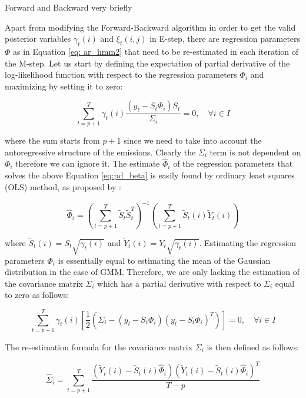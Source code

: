 Forward and Backward very briefly

Apart from modifying the Forward-Backward algorithm in order to get the valid posterior variables $\gamma_t(i)$ and $\xi_t(i,j)$ in E-step, there are 
regression parameters $\Phi$ as in Equation \ref{eq: ar_hmm2} that need to be re-estimated in each iteration of the M-step. Let us start by defining the 
expectation of partial derivative of the log-likelihood function with respect to the regression parameters $\Phi_{i}$ and maximizing by setting it to zero:

\begin{equation} \label{eq:pd_beta}
    \sum_{t=p+1}^{T} \gamma_t(i) \frac{(y_t - S_t \Phi_{i})S_t}{\Sigma_i} = 0, \quad \forall i \in I
\end{equation}

where the sum starts from $p+1$ since we need to take into account the autoregressive structure of the emissions. Clearly the $\Sigma_i$ term is not dependent on $\Phi_i$ therefore we can
ignore it. The estimate $\hat{\Phi}_i$ of the regression parameters that solves the above Equation \ref{eq:pd_beta} is easily found by ordinary least squares (OLS) method, as proposed by \citep{Xuan2004}:

\begin{equation}
    \hat{\Phi}_i = \left( \sum_{t=p+1}^{T} \tilde{S}_t \tilde{S}_t^T \right)^{-1} \left( \sum_{t=p+1}^{T} \tilde{S}_t(i) \tilde{Y}_t(i) \right)
\end{equation}

where $\tilde{S}_t(i) = S_t \sqrt{\gamma_t(i)}$ and $\tilde{Y}_t(i) = Y_t \sqrt{\gamma_t(i)}$. Estimating the regression parameters $\Phi_i$ is essentially 
equal to estimating the mean of the Gaussian distribution in the case of GMM. Therefore, we are only lacking the estimation of the covariance matrix $\Sigma_i$
which has a partial derivative with respect to $\Sigma_i$ equal to zero as follows:

\begin{equation} \label{eq:pd_sigma}
    \sum_{t=p+1}^{T} \gamma_t(i) \left[\frac{1}{2} \left(\Sigma_i - (y_t - S_t \Phi_{i})(y_t - S_t \Phi_{i})^T\right) \right] = 0, \quad \forall i \in I
\end{equation}

The re-estimation formula for the covariance matrix $\Sigma_i$ is then defined as follows:

\begin{equation}
    \hat{\Sigma}_i = \sum_{t=p+1}^{T} \frac{\left(\tilde{Y}_t(i) - \tilde{S}_t(i) \hat{\Phi}_i \right) \left(\tilde{Y}_t(i) - \tilde{S}_t(i) \hat{\Phi}_i \right)^T}{T - p}
\end{equation}

